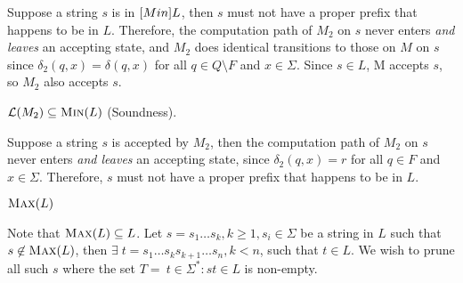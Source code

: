\begin{problem}
\begin{Answer}
\begin{enumalph}
\begin{enumroman}
            Suppose a string $s$ is in $\textsc[Min]{L}$,
            then $s$ must not have a proper prefix that happens to be in $L$.
            Therefore, the computation path of $M_2$ on $s$ never enters \emph{and leaves} an accepting state,
            and $M_2$ does identical transitions to those on $M$ on $s$
            since $\delta_2(q, x) = \delta(q, x)$ for all $q \in Q \setminus F$ and $x \in \Sigma$.
            Since $s \in L$, M accepts $s$, so $M_2$ also accepts $s$.
          \item $\calL(M_2) \subseteq \textsc{Min}(L)$ (Soundness).
          
            Suppose a string $s$ is accepted by $M_2$,
            then the computation path of $M_2$ on $s$ never enters \emph{and leaves} an accepting state,
            since $\delta_2(q, x) = r$ for all $q \in F$ and $x \in \Sigma$.
            Therefore, $s$ must not have a proper prefix that happens to be in $L$.
        \end{enumroman}
      \item $\textsc{Max}(L)$
      
      \step
      Note that $\textsc{Max}(L) \subseteq L$. Let $s = s_1\ldots s_k, k \ge 1, s_i \in \Sigma$ be a string in $L$ such that $s \notin \textsc{Max}(L)$,
      then $\exists\; t = s_1 \ldots s_k s_{k+1} \ldots s_n, k < n$, such that $t \in L$.
      We wish to prune all such $s$ where the set $T = \ t \in \Sigma^* : st \in L$ is non-empty.
    \end{enumalph}
  \end{Answer}
\end{problem}
